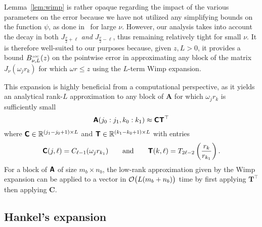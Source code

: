 Lemma~\ref{lem:wimp} is rather opaque regarding the impact of the various
parameters on the error because we have not utilized any simplifying bounds on
the function $\psi$, as done in~\cite[Lemma 1]{rangan2020factorization} for
large $\nu$. However, our analysis takes into account the decay in both
$J_{\frac{\nu}{2}+\ell}$ \textit{and} $J_{\frac{\nu}{2}-\ell}$, thus remaining
relatively tight for small $\nu$. It is therefore well-suited to our purposes
because, given $z, L > 0$, it provides a bound $\Bloc(z)$ on the pointwise error
in approximating any block of the matrix $J_\nu(\omega_j r_k)$ for which $\omega
r \leq z$ using the $L$-term Wimp expansion. 

This expansion is highly beneficial from a computational perspective, as it
yields an analytical rank-$L$ approximation to any block of $\bm{A}$ for which
$\omega_j r_k$ is sufficiently small
\begin{equation}
  \bm{\mathsf{A}}(j_0:j_1, k_0:k_1)
  \approx \bm{\mathsf{C}}\bm{\mathsf{T}}^\top
\end{equation}
where $\bm{\mathsf{C}} \in \mathbb{R}^{(j_1-j_0+1) \times L}$ and $\bm{\mathsf{T}} \in \mathbb{R}^{(k_1-k_0+1)
  \times L}$ with entries
\begin{equation}
  \bm{\mathsf{C}}(j,\ell) = C_{\ell-1}(\omega_j r_{k_1}) \qquad  \text{and} \qquad 
  \bm{\mathsf{T}}(k,\ell) = T_{2\ell-2}\left(\frac{r_k}{r_{k_1}}\right).
\end{equation}
For a block of $\bm{\mathsf{A}}$ of size $m_b \times n_b$, the low-rank approximation
given by the Wimp expansion can be applied to a vector in $\mathcal{O}\big(L(m_b +
n_b)\big)$ time by first applying $\bm{T}^\top$ then applying $\bm{C}$.

\subsection{Hankel's expansion}
\label{sec:asymptotic}

